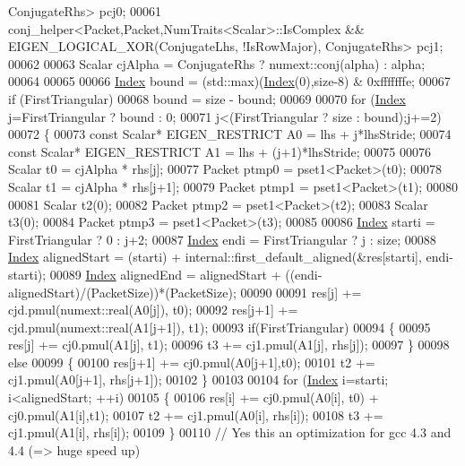 \begin{DoxyCode}
      ConjugateRhs> pcj0;
00061   conj\_helper<Packet,Packet,NumTraits<Scalar>::IsComplex && EIGEN\_LOGICAL\_XOR(ConjugateLhs, !IsRowMajor), 
      ConjugateRhs> pcj1;
00062 
00063   Scalar cjAlpha = ConjugateRhs ? numext::conj(alpha) : alpha;
00064 
00065 
00066   \hyperlink{namespace_eigen_a62e77e0933482dafde8fe197d9a2cfde}{Index} bound = (std::max)(\hyperlink{namespace_eigen_a62e77e0933482dafde8fe197d9a2cfde}{Index}(0),size-8) & 0xfffffffe;
00067   \textcolor{keywordflow}{if} (FirstTriangular)
00068     bound = size - bound;
00069 
00070   \textcolor{keywordflow}{for} (\hyperlink{namespace_eigen_a62e77e0933482dafde8fe197d9a2cfde}{Index} j=FirstTriangular ? bound : 0;
00071        j<(FirstTriangular ? size : bound);j+=2)
00072   \{
00073     \textcolor{keyword}{const} Scalar* EIGEN\_RESTRICT A0 = lhs + j*lhsStride;
00074     \textcolor{keyword}{const} Scalar* EIGEN\_RESTRICT A1 = lhs + (j+1)*lhsStride;
00075 
00076     Scalar t0 = cjAlpha * rhs[j];
00077     Packet ptmp0 = pset1<Packet>(t0);
00078     Scalar t1 = cjAlpha * rhs[j+1];
00079     Packet ptmp1 = pset1<Packet>(t1);
00080 
00081     Scalar t2(0);
00082     Packet ptmp2 = pset1<Packet>(t2);
00083     Scalar t3(0);
00084     Packet ptmp3 = pset1<Packet>(t3);
00085 
00086     \hyperlink{namespace_eigen_a62e77e0933482dafde8fe197d9a2cfde}{Index} starti = FirstTriangular ? 0 : j+2;
00087     \hyperlink{namespace_eigen_a62e77e0933482dafde8fe197d9a2cfde}{Index} endi   = FirstTriangular ? j : size;
00088     \hyperlink{namespace_eigen_a62e77e0933482dafde8fe197d9a2cfde}{Index} alignedStart = (starti) + internal::first\_default\_aligned(&res[starti], endi-starti);
00089     \hyperlink{namespace_eigen_a62e77e0933482dafde8fe197d9a2cfde}{Index} alignedEnd = alignedStart + ((endi-alignedStart)/(PacketSize))*(PacketSize);
00090 
00091     res[j]   += cjd.pmul(numext::real(A0[j]), t0);
00092     res[j+1] += cjd.pmul(numext::real(A1[j+1]), t1);
00093     \textcolor{keywordflow}{if}(FirstTriangular)
00094     \{
00095       res[j]   += cj0.pmul(A1[j],   t1);
00096       t3       += cj1.pmul(A1[j],   rhs[j]);
00097     \}
00098     \textcolor{keywordflow}{else}
00099     \{
00100       res[j+1] += cj0.pmul(A0[j+1],t0);
00101       t2 += cj1.pmul(A0[j+1], rhs[j+1]);
00102     \}
00103 
00104     \textcolor{keywordflow}{for} (\hyperlink{namespace_eigen_a62e77e0933482dafde8fe197d9a2cfde}{Index} i=starti; i<alignedStart; ++i)
00105     \{
00106       res[i] += cj0.pmul(A0[i], t0) + cj0.pmul(A1[i],t1);
00107       t2 += cj1.pmul(A0[i], rhs[i]);
00108       t3 += cj1.pmul(A1[i], rhs[i]);
00109     \}
00110     \textcolor{comment}{// Yes this an optimization for gcc 4.3 and 4.4 (=> huge speed up)}

\end{DoxyCode}
